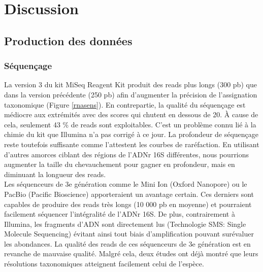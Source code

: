 \documentclass[12pt,a4paper]{article}
\begin{document}
{\newpage
\section{Discussion}
\subsection{Production des données}
\subsubsection{Séquençage}
La version 3 du kit MiSeq Reagent Kit produit des reads plus longs (300 pb) que dans la version précédente (250 pb) afin d'augmenter la précision de l'assignation taxonomique (Figure \ref{rnasens}). En contrepartie, la qualité du séquençage est médiocre aux extrémités avec des scores qui chutent en dessous de 20. À cause de cela, seulement 43 \% de reads sont exploitables.
C'est un problème connu lié à la chimie du kit que Illumina n'a pas corrigé à ce jour. La profondeur de séquençage reste toutefois suffisante comme l'attestent les courbes de raréfaction. En utilisant d'autres amorces ciblant des régions de l'ADNr 16S différentes, nous pourrions augmenter la taille du chevauchement pour gagner en profondeur, mais en diminuant la longueur des reads. \\
Les séquenceurs de 3e génération comme le Mini Ion (Oxford Nanopore) ou le PacBio (Pacific Bioscience) apporteraient un avantage certain. Ces derniers sont capables de produire des reads très longs (10 000 pb en moyenne) et pourraient facilement séquencer l'intégralité de l'ADNr 16S. De plus, contrairement à Illumina, les fragments d'ADN sont directement lus (Technologie SMS: Single Molecule Sequencing) évitant ainsi tout biais d'amplification pouvant surévaluer les abondances.
La qualité des reads de ces séquenceurs de 3e génération est en revanche de mauvaise qualité. Malgré cela, deux études\cite{Wagner2016,Benitez-Paez2016} ont déjà montré que leurs résolutions taxonomiques atteignent facilement celui de l’espèce.

}
\end{document}
